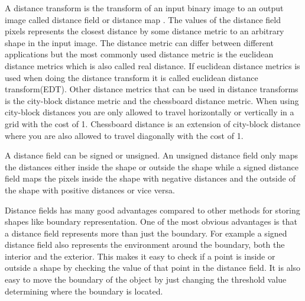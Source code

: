 A distance transform is the transform of an input binary image to an output image called distance field or distance map \citep{rosenfeld1966}. The values of the distance field pixels represents the closest distance by some distance metric to an arbitrary shape in the input image. The distance metric can differ between different applications but the most commonly used distance metric is the euclidean distance metrics which is also called real distance. If euclidean distance metrics is used when doing the distance transform it is called euclidean distance transform(EDT). Other distance metrics that can be used in distance transforms is the city-block distance metric and the chessboard distance metric. When using city-block distances you are only allowed to travel horizontally or vertically in a grid with the cost of 1. Chessboard distance is an extension of city-block distance where you are also allowed to travel diagonally with the cost of 1. 

A distance field can be signed or unsigned. An unsigned distance field only maps the distances either inside the shape or outside the shape while a signed distance field maps the pixels inside the shape with negative distances and the outside of the shape with positive distances or vice versa.

Distance fields has many good advantages compared to other methods for storing shapes like boundary representation. One of the most obvious advantages is that a distance field represents more than just the boundary. For example a signed distance field also represents the environment around the boundary, both the interior and the exterior. This makes it easy to check if a point is inside or outside a shape by checking the value of that point in the distance field. It is also easy to move the boundary of the object by just changing the threshold value determining where the boundary is located. \citep{Jones2006}

